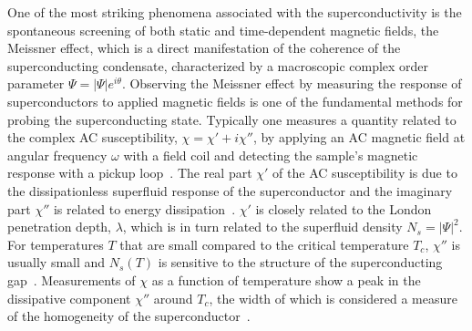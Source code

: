 \documentclass[%
 reprint,
 superscriptaddress,
 amsmath,
 amssymb,
 amsfonts,
 aps,
 prb,
]{revtex4-2}
\newcommand{\Tc}{T_c}
\begin{document}
One of the most striking phenomena associated with the superconductivity is the spontaneous screening of both static and time-dependent magnetic fields, the Meissner effect, which is a direct manifestation of the coherence of the superconducting condensate, characterized by a macroscopic complex order parameter $\Psi=|\Psi|e^{i\theta}$. Observing the Meissner effect by measuring the response of superconductors to applied magnetic fields is one of the fundamental methods for probing the superconducting state. Typically one measures a quantity related to the complex AC susceptibility, $\chi=\chi'+i\chi''$, by applying an AC magnetic field at angular frequency $\omega$ with a field coil and detecting the sample's magnetic response with a pickup loop~\cite{Fiory1988-zw, Jeanneret1989-ss, Clem1992-ko, Claassen1997-sb, He2016-pz}. The real part $\chi'$ of the AC susceptibility is due to the dissipationless superfluid response of the superconductor and the imaginary part $\chi''$ is related to energy dissipation~\cite{Clem1991-vq, Goldfard1991-ws, Clem1994-qu}. $\chi'$ is closely related to the London penetration depth, $\lambda$, which is in turn related to the superfluid density $N_s=|\Psi|^2$. For temperatures $T$ that are small compared to the critical temperature $\Tc$, $\chi''$ is usually small and $N_s(T)$ is sensitive to the structure of the superconducting gap~\cite{Prozorov2011-vi}. Measurements of $\chi$ as a function of temperature show a peak in the dissipative component $\chi''$ around $\Tc$, the width of which is considered a measure of the homogeneity of the superconductor~\cite{Fiory1988-zw, Bozovic2016-sl}. 
\end{document}
